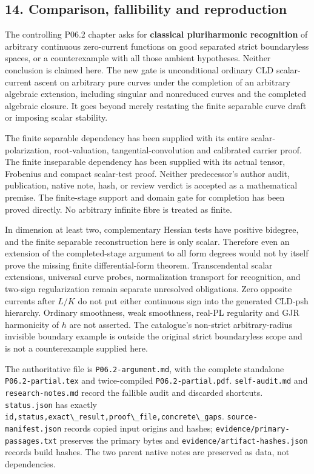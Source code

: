 \documentclass[
  11pt,
]{article}
\newcommand{\passthrough}[1]{#1}
\begin{document}
\subsection{14. Comparison, fallibility and
reproduction}\label{comparison-fallibility-and-reproduction}

The controlling P06.2 chapter asks for \textbf{classical pluriharmonic
recognition} of arbitrary continuous zero-current functions on good
separated strict boundaryless spaces, or a counterexample with all those
ambient hypotheses. Neither conclusion is claimed here. The new gate is
unconditional ordinary CLD scalar-current ascent on arbitrary pure
curves under the completion of an arbitrary algebraic extension,
including singular and nonreduced curves and the completed algebraic
closure. It goes beyond merely restating the finite separable curve
draft or imposing scalar stability.

The finite separable dependency has been supplied with its entire
scalar-polarization, root-valuation, tangential-convolution and
calibrated carrier proof. The finite inseparable dependency has been
supplied with its actual tensor, Frobenius and compact scalar-test
proof. Neither predecessor's author audit, publication, native note,
hash, or review verdict is accepted as a mathematical premise. The
finite-stage support and domain gate for completion has been proved
directly. No arbitrary infinite fibre is treated as finite.

In dimension at least two, complementary Hessian tests have positive
bidegree, and the finite separable reconstruction here is only scalar.
Therefore even an extension of the completed-stage argument to all form
degrees would not by itself prove the missing finite differential-form
theorem. Transcendental scalar extensions, universal curve probes,
normalization transport for recognition, and two-sign regularization
remain separate unresolved obligations. Zero opposite currents after
\(L/K\) do not put either continuous sign into the generated CLD-psh
hierarchy. Ordinary smoothness, weak smoothness, real-PL regularity and
GJR harmonicity of \(h\) are not asserted. The catalogue's non-strict
arbitrary-radius invisible boundary example is outside the original
strict boundaryless scope and is not a counterexample supplied here.

The authoritative file is \passthrough{\lstinline!P06.2-argument.md!},
with the complete standalone \passthrough{\lstinline!P06.2-partial.tex!}
and twice-compiled \passthrough{\lstinline!P06.2-partial.pdf!}.
\passthrough{\lstinline!self-audit.md!} and
\passthrough{\lstinline!research-notes.md!} record the fallible audit
and discarded shortcuts. \passthrough{\lstinline!status.json!} has
exactly
\passthrough{\lstinline!id,status,exact\_result,proof\_file,concrete\_gaps!}.
\passthrough{\lstinline!source-manifest.json!} records copied input
origins and hashes;
\passthrough{\lstinline!evidence/primary-passages.txt!} preserves the
primary bytes and
\passthrough{\lstinline!evidence/artifact-hashes.json!} records build
hashes. The two parent native notes are preserved as data, not
dependencies.
\end{document}
